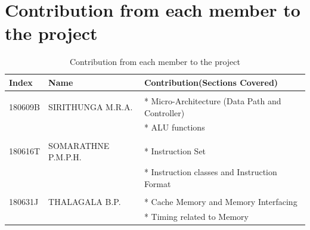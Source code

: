 \documentclass[a4paper,11pt]{article}
\begin{document}

\tableofcontents
\section*{\textbf{{Contribution from each member to the project}}}

\begin{table}[!h]
	\centering

		\begin{tabular}{|l|l|l|}
			\hline
			\textbf{Index}	&\textbf{Name} 	&\textbf{Contribution(Sections Covered)}\\ \hline
			&&\\
		180609B  	&SIRITHUNGA M.R.A. &* Micro-Architecture (Data Path and  Controller)\\
		&&* ALU functions\\ \hline&&\\

 		180616T  	&SOMARATHNE P.M.P.H. &* Instruction Set\\
 		&&*  Instruction classes and Instruction Format\\\hline&&\\

 		180631J		&THALAGALA B.P.&* Cache Memory and Memory Interfacing\\
 		&&*  Timing related to Memory\\\hline
		\end{tabular}

			\caption{Contribution from each member to the project}
\end{table}

\pagebreak
\end{document}
